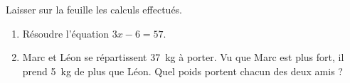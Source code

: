 
\begin{exercice}\label{exo2smath-0306}

    Laisser sur la feuille les calculs effectués.
    \begin{enumerate}
        \item
            Résoudre l'équation \( 3x-6=57\).
        \item
            Marc et Léon se répartissent \SI{37}{\kilo\gram} à porter. Vu que Marc est plus fort, il prend \SI{5}{\kilo\gram} de plus que Léon. Quel poids portent chacun des deux amis ?
    \end{enumerate}


\end{exercice}
